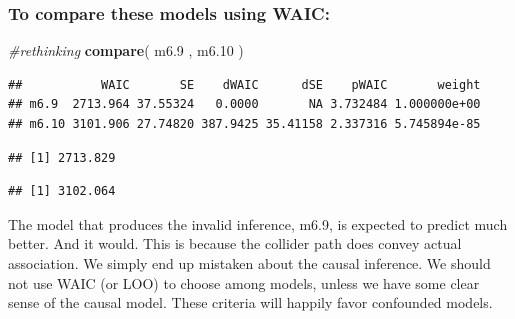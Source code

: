\documentclass[
]{article}
\newenvironment{Shaded}{\begin{snugshade}}{\end{snugshade}}
\newcommand{\CommentTok}[1]{\textcolor[rgb]{0.56,0.35,0.01}{\textit{#1}}}
\newcommand{\FloatTok}[1]{\textcolor[rgb]{0.00,0.00,0.81}{#1}}
\newcommand{\KeywordTok}[1]{\textcolor[rgb]{0.13,0.29,0.53}{\textbf{#1}}}
\newcommand{\NormalTok}[1]{#1}
\newcommand{\OperatorTok}[1]{\textcolor[rgb]{0.81,0.36,0.00}{\textbf{#1}}}
\begin{document}
\hypertarget{to-compare-these-models-using-waic}{%
\subsubsection{To compare these models using
WAIC:}\label{to-compare-these-models-using-waic}}

\begin{Shaded}
\begin{Highlighting}[]
\CommentTok{#rethinking}
 \KeywordTok{compare}\NormalTok{( m6}\FloatTok{.9}\NormalTok{ , m6}\FloatTok{.10}\NormalTok{ )}
\end{Highlighting}
\end{Shaded}

\begin{verbatim}
##           WAIC       SE    dWAIC      dSE    pWAIC       weight
## m6.9  2713.964 37.55324   0.0000       NA 3.732484 1.000000e+00
## m6.10 3101.906 27.74820 387.9425 35.41158 2.337316 5.745894e-85
\end{verbatim}

\begin{Shaded}
\end{Shaded}

\begin{verbatim}
## [1] 2713.829
\end{verbatim}

\begin{Shaded}
\end{Shaded}

\begin{verbatim}
## [1] 3102.064
\end{verbatim}

The model that produces the invalid inference, m6.9, is expected to
predict much better. And it would. This is because the collider path
does convey actual association. We simply end up mistaken about the
causal inference. We should not use WAIC (or LOO) to choose among
models, unless we have some clear sense of the causal model. These
criteria will happily favor confounded models.
\end{document}
